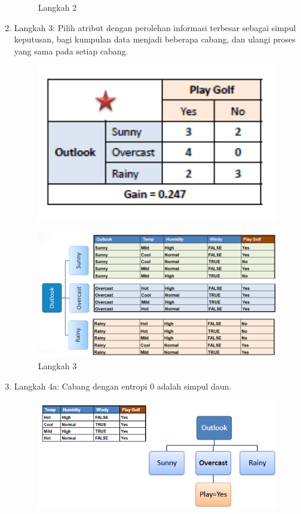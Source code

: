 \begin{enumerate}
\begin{figure}[H]
        \caption{Langkah 2}
    \end{figure}
    \item Langkah 3: Pilih atribut dengan perolehan informasi terbesar sebagai simpul keputusan, bagi kumpulan data menjadi beberapa cabang, dan ulangi proses yang sama pada setiap cabang.
    \begin{figure}[H]
        \centering
        \includegraphics[width=12cm]{figures/chapter2/15.png}
    \end{figure}
    \begin{figure}[H]
        \centering
        \includegraphics[width=12cm]{figures/chapter2/16.png}
        \caption{Langkah 3}
    \end{figure}
    \item Langkah 4a: Cabang dengan entropi 0 adalah simpul daun.
    \begin{figure}[H]
        \centering
        \includegraphics[width=12cm]{figures/chapter2/17.png}

\end{figure}
\end{enumerate}
